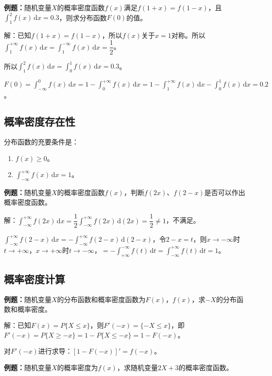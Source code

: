 \documentclass[UTF8, 12pt]{ctexart}
\begin{document}
\textbf{例题：}随机变量$X$的概率密度函数$f(x)$满足$f(1+x)=f(1-x)$，且$\int_1^2f(x)\,\textrm{d}x=0.3$，则求分布函数$F(0)$的值。

解：已知$f(1+x)=f(1-x)$，所以$f(x)$关于$x=1$对称。所以$\int_1^{+\infty}f(x)\,\textrm{d}x=\int_1^{-\infty}f(x)\,\textrm{d}x=\dfrac{1}{2}$。

所以$\int_1^2f(x)\,\textrm{d}x=\int_0^1f(x)\,\textrm{d}x=0.3$。

$F(0)=\int_{-\infty}^0f(x)\,\textrm{d}x=1-\int_0^{+\infty}f(x)\,\textrm{d}x=1-\int_1^{+\infty}f(x)\,\textrm{d}x-\int_0^1f(x)\,\textrm{d}x=0.2$。

\subsection{概率密度存在性}

分布函数的充要条件是：

\begin{enumerate}
    \item $f(x)\geqslant0$。
    \item $\int_{-\infty}^{+\infty}f(x)\,\textrm{d}x=1$。
\end{enumerate}

\textbf{例题：}随机变量$X$的概率密度函数$f(x)$，判断$f(2x)$、$f(2-x)$是否可以作出概率密度函数。

解：$\int_{-\infty}^{+\infty}f(2x)\,\textrm{d}x=\dfrac{1}{2}\int_{-\infty}^{+\infty}f(2x)\,\textrm{d}(2x)=\dfrac{1}{2}\neq1$，不满足。

$\int_{-\infty}^{+\infty}f(2-x)\,\textrm{d}x=-\int_{-\infty}^{+\infty}f(2-x)\,\textrm{d}(2-x)$，令$2-x=t$，则$x\to-\infty$时$t\to+\infty$，$x\to+\infty$时$t\to-\infty$，$=-\int_{+\infty}^{-\infty}f(t)\,\textrm{d}t=\int_{-\infty}^{+\infty}f(t)\,\textrm{d}t=1$。

\subsection{概率密度计算}

\textbf{例题：}随机变量$X$的分布函数和概率密度函数为$F(x)$，$f(x)$，求$-X$的分布函数和概率密度。

解：已知$F(x)=P\{X\leqslant x\}$，则$F'(-x)=\{-X\leqslant x\}$，即$F'(-x)=P\{X\geqslant-x\}=1-P\{X\leqslant-x\}=1-F(-x)$。

对$F'(-x)$进行求导：$[1-F(-x)]'=f(-x)$。

\textbf{例题：}随机变量$X$的概率密度为$f(x)$，求随机变量$2X+3$的概率密度函数。
\end{document}
